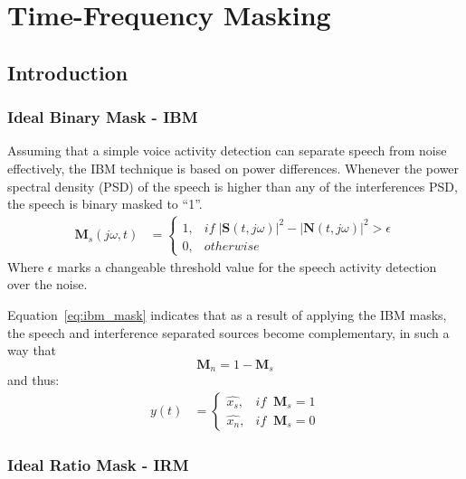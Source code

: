 \chapter{Time-Frequency Masking}
\section{Introduction}

\subsection{Ideal Binary Mask - IBM}
Assuming that a simple voice activity detection
can separate speech from noise effectively,
the IBM technique is based on power differences.
Whenever the power spectral density (PSD) of the speech
is higher than any of the interferences PSD, 
the speech is binary masked to ``1''.
\begin{align}\label{eq:ibm_mask}
    \mathbf{M}_{s}(j\omega, t) & = 
        \begin{cases}
            1, & if\;|\mathbf{S}(t,j\omega)|^2 - |\mathbf{N}(t,j\omega)|^2 > \epsilon \\
            0, & otherwise
        \end{cases}
\end{align}
Where \(\epsilon\) marks a changeable threshold value 
for the speech activity detection over the noise.

Equation~\ref{eq:ibm_mask} indicates that as a result of 
applying the IBM masks, the speech and interference separated
sources become complementary, in such a way that
\[\mathbf{M}_{n} = 1 - \mathbf{M}_{s} \] and thus:
\begin{align}
    y(t) &= \begin{cases}
        \hat{x_{s}}, &if\;\;\mathbf{M}_{s} = 1 \\
        \hat{x_{n}}, &if\;\;\mathbf{M}_{s} = 0
    \end{cases}
\end{align}

\subsection{Ideal Ratio Mask - IRM}

